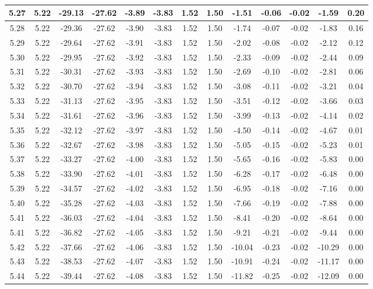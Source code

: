 \begin{table}[htbp]
\begin{adjustbox}{angle=90}
\begin{tabular}{|c|c|c|c|c|c|c|c|c|c|c|c|c|}
 5.27 & 5.22 & -29.13 & -27.62 & -3.89 & -3.83 & 1.52 & 1.50 & -1.51 & -0.06 & -0.02 & -1.59 & 0.20\\ \hline
 5.28 & 5.22 & -29.36 & -27.62 & -3.90 & -3.83 & 1.52 & 1.50 & -1.74 & -0.07 & -0.02 & -1.83 & 0.16\\ \hline
 5.29 & 5.22 & -29.64 & -27.62 & -3.91 & -3.83 & 1.52 & 1.50 & -2.02 & -0.08 & -0.02 & -2.12 & 0.12\\ \hline
 5.30 & 5.22 & -29.95 & -27.62 & -3.92 & -3.83 & 1.52 & 1.50 & -2.33 & -0.09 & -0.02 & -2.44 & 0.09\\ \hline
 5.31 & 5.22 & -30.31 & -27.62 & -3.93 & -3.83 & 1.52 & 1.50 & -2.69 & -0.10 & -0.02 & -2.81 & 0.06\\ \hline
 5.32 & 5.22 & -30.70 & -27.62 & -3.94 & -3.83 & 1.52 & 1.50 & -3.08 & -0.11 & -0.02 & -3.21 & 0.04\\ \hline
 5.33 & 5.22 & -31.13 & -27.62 & -3.95 & -3.83 & 1.52 & 1.50 & -3.51 & -0.12 & -0.02 & -3.66 & 0.03\\ \hline
 5.34 & 5.22 & -31.61 & -27.62 & -3.96 & -3.83 & 1.52 & 1.50 & -3.99 & -0.13 & -0.02 & -4.14 & 0.02\\ \hline
 5.35 & 5.22 & -32.12 & -27.62 & -3.97 & -3.83 & 1.52 & 1.50 & -4.50 & -0.14 & -0.02 & -4.67 & 0.01\\ \hline
 5.36 & 5.22 & -32.67 & -27.62 & -3.98 & -3.83 & 1.52 & 1.50 & -5.05 & -0.15 & -0.02 & -5.23 & 0.01\\ \hline
 5.37 & 5.22 & -33.27 & -27.62 & -4.00 & -3.83 & 1.52 & 1.50 & -5.65 & -0.16 & -0.02 & -5.83 & 0.00\\ \hline
 5.38 & 5.22 & -33.90 & -27.62 & -4.01 & -3.83 & 1.52 & 1.50 & -6.28 & -0.17 & -0.02 & -6.48 & 0.00\\ \hline
 5.39 & 5.22 & -34.57 & -27.62 & -4.02 & -3.83 & 1.52 & 1.50 & -6.95 & -0.18 & -0.02 & -7.16 & 0.00\\ \hline
 5.40 & 5.22 & -35.28 & -27.62 & -4.03 & -3.83 & 1.52 & 1.50 & -7.66 & -0.19 & -0.02 & -7.88 & 0.00\\ \hline
 5.41 & 5.22 & -36.03 & -27.62 & -4.04 & -3.83 & 1.52 & 1.50 & -8.41 & -0.20 & -0.02 & -8.64 & 0.00\\ \hline
 5.41 & 5.22 & -36.82 & -27.62 & -4.05 & -3.83 & 1.52 & 1.50 & -9.21 & -0.21 & -0.02 & -9.44 & 0.00\\ \hline
 5.42 & 5.22 & -37.66 & -27.62 & -4.06 & -3.83 & 1.52 & 1.50 & -10.04 & -0.23 & -0.02 & -10.29 & 0.00\\ \hline
 5.43 & 5.22 & -38.53 & -27.62 & -4.07 & -3.83 & 1.52 & 1.50 & -10.91 & -0.24 & -0.02 & -11.17 & 0.00\\ \hline
 5.44 & 5.22 & -39.44 & -27.62 & -4.08 & -3.83 & 1.52 & 1.50 & -11.82 & -0.25 & -0.02 & -12.09 & 0.00\\ \hline
            \end{tabular}
        \end{adjustbox}
        \caption{}
        \label{}
    \end{table}
    